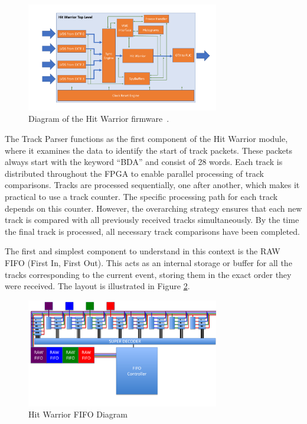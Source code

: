 \begin{figure}[ht]
  \centering
  \includegraphics[width=0.75\textwidth]{figures/ftk/hw_top_diagram.pdf}
  \caption{Diagram of the Hit Warrior firmware~\cite{Aad_2021}.}
  \label{fig:hw_top_diagram}
\end{figure}

The Track Parser functions as the first component of the Hit Warrior module, where it examines the data to identify the start of track packets. These packets always start with the keyword ``BDA'' and consist of 28 words. Each track is distributed throughout the FPGA to enable parallel processing of track comparisons. Tracks are processed sequentially, one after another, which makes it practical to use a track counter. The specific processing path for each track depends on this counter. However, the overarching strategy ensures that each new track is compared with all previously received tracks simultaneously. By the time the final track is processed, all necessary track comparisons have been completed.

The first and simplest component to understand in this context is the RAW FIFO (First In, First Out). This acts as an internal storage or buffer for all the tracks corresponding to the current event, storing them in the exact order they were received.
The layout is illustrated in Figure \ref{fig:hw_fifo}.

\begin{figure}[ht]
  \centering
  \includegraphics[width=0.75\textwidth]{figures/ftk/hw_fifo.pdf}
  \caption{Hit Warrior FIFO Diagram}
  \label{fig:hw_fifo}
\end{figure}

